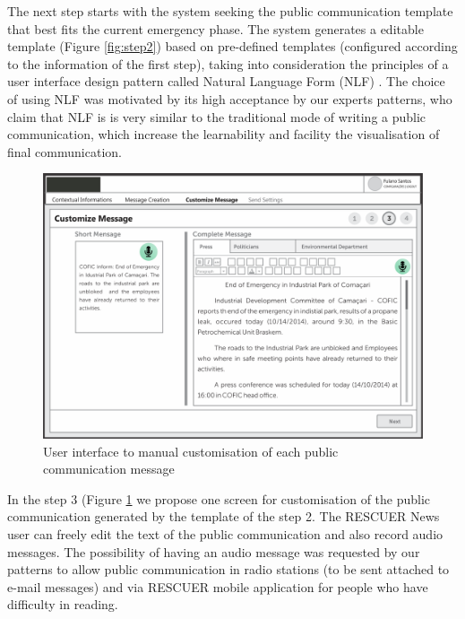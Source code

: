 The next step starts with the system seeking the public communication template that best fits
the current emergency phase. The system generates a editable template (Figure \ref{fig:step2}) based on pre-defined templates (configured according to the information of the first step), taking into consideration the principles of a user interface design pattern called Natural Language Form (NLF) \citep{nlf}. The choice of using NLF was motivated by its high acceptance by our experts patterns, who claim that NLF is is very similar to the traditional mode of writing a public communication, which increase the learnability and facility the visualisation of final communication.

\begin{figure}
\centering
\includegraphics[width=\linewidth]{images/step3.png}
\caption{User interface to manual customisation of each public communication message}
\label{fig:step3}
\end{figure}

In the step 3 (Figure \ref{fig:step3} we propose one screen for customisation of the public communication generated by the template of the step 2. The RESCUER News user can freely edit the text of the public communication and also record audio messages. The possibility of having an audio message was requested by our patterns to allow public communication in radio stations (to be sent attached to e-mail messages) and via RESCUER mobile application for people who have difficulty in reading.

